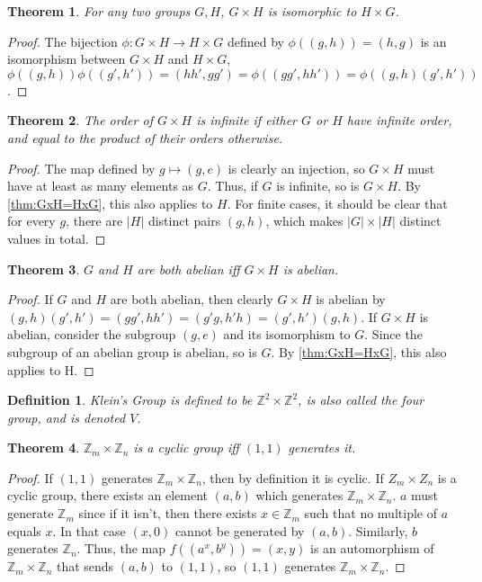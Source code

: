 \documentclass{article}
\newtheorem{theorem}{Theorem}[section]
\newtheorem{definition}{Definition}[section]
\begin{document}
\begin{theorem}
    \label{thm:GxH=HxG}
    For any two groups $G,H$, $G \times H$ is isomorphic to $H \times G$.
\end{theorem}
\begin{proof}
    The bijection $\phi : G \times H \to H \times G$ defined by $\phi((g,h)) = (h,g)$ is an isomorphism between $G \times H$ and $H \times G$,
    $\phi((g,h))\phi((g',h')) = (hh',gg') = \phi((gg',hh')) = \phi((g,h)(g',h'))$.
\end{proof}

\begin{theorem}
    The order of $G \times H$ is infinite if either $G$ or $H$ have infinite order,
    and equal to the product of their orders otherwise.
\end{theorem}
\begin{proof}
    The map defined by $g \mapsto (g,e)$ is clearly an injection, 
    so $G \times H$ must have at least as many elements as $G$.
    Thus, if $G$ is infinite, so is $G \times H$.
    By \autoref{thm:GxH=HxG}, this also applies to $H$.
    For finite cases, it should be clear that for every $g$, 
    there are $|H|$ distinct pairs $(g,h)$, which makes $|G| \times |H|$ distinct values in total.
\end{proof}

\begin{theorem}
    $G$ and $H$ are both abelian iff $G \times H$ is abelian.
\end{theorem}
\begin{proof}
    If $G$ and $H$ are both abelian, then clearly $G \times H$ is abelian by
    $(g,h)(g',h') = (gg',hh') = (g'g,h'h) = (g',h')(g,h)$.
    If $G \times H$ is abelian, consider the subgroup $(g,e)$ and its isomorphism to $G$. 
    Since the subgroup of an abelian group is abelian, so is $G$.
    By \autoref{thm:GxH=HxG}, this also applies to H.
\end{proof}

\begin{definition}
    \emph{Klein's Group} is defined to be $\mathbb{Z}^{2} \times \mathbb{Z}^{2}$, 
    is also called the \emph{four group}, and is denoted $V$.
\end{definition}

\begin{theorem}
    $\mathbb{Z}_{m} \times \mathbb{Z}_{n}$ is a cyclic group iff $(1,1)$ generates it.
\end{theorem}
\begin{proof}
    If $(1,1)$ generates $\mathbb{Z}_m \times \mathbb{Z}_n$, then by definition it is cyclic.
    If $Z_{m} \times Z_{n}$ is a cyclic group,
    there exists an element $(a,b)$ which generates $\mathbb{Z}_m \times \mathbb{Z}_n$.
    $a$ must generate $\mathbb{Z}_m$ since if it isn't, 
    then there exists $x \in \mathbb{Z}_m$ such that no multiple of $a$ equals $x$.
    In that case $(x,0)$ cannot be generated by $(a,b)$.
    Similarly, $b$ generates $\mathbb{Z}_n$.
    Thus, the map $f((a^{x},b^{y})) = (x,y)$ is an automorphism of $\mathbb{Z}_m \times \mathbb{Z}_n$
    that sends $(a,b)$ to $(1,1)$, so $(1,1)$ generates $\mathbb{Z}_m \times \mathbb{Z}_n$.
\end{proof}
\end{document}
